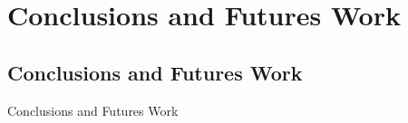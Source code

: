 \chapter{Conclusions and Futures Work}
\label{Conclusions and Futures Work}
  \singlespace
  \onehalfspace
  \acresetall

\section{Conclusions and Futures Work}
\label{sec:Conclusions and Futures Work}
Conclusions and Futures Work
